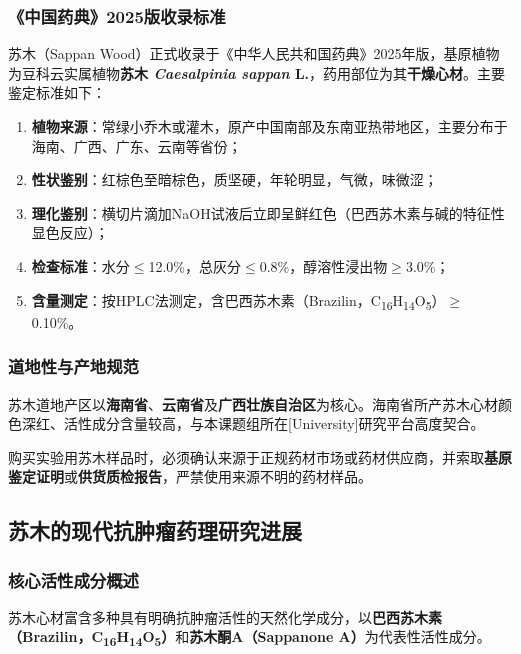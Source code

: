 \documentclass[12pt,a4paper]{article}
\begin{document}
\subsubsection{《中国药典》2025版收录标准}

苏木（Sappan Wood）正式收录于《中华人民共和国药典》2025年版，基原植物为豆科云实属植物\textbf{苏木 \textit{Caesalpinia sappan} L.}，药用部位为其\textbf{干燥心材}\cite{ref1}。主要鉴定标准如下：

\begin{enumerate}
\item \textbf{植物来源}：常绿小乔木或灌木，原产中国南部及东南亚热带地区，主要分布于海南、广西、广东、云南等省份；
\item \textbf{性状鉴别}：红棕色至暗棕色，质坚硬，年轮明显，气微，味微涩；
\item \textbf{理化鉴别}：横切片滴加NaOH试液后立即呈鲜红色（巴西苏木素与碱的特征性显色反应）；
\item \textbf{检查标准}：水分$\leq$12.0\%，总灰分$\leq$0.8\%，醇溶性浸出物$\geq$3.0\%；
\item \textbf{含量测定}：按HPLC法测定，含巴西苏木素（Brazilin，C\textsubscript{16}H\textsubscript{14}O\textsubscript{5}）$\geq$0.10\%。
\end{enumerate}

\subsubsection{道地性与产地规范}

苏木道地产区以\textbf{海南省}、\textbf{云南省}及\textbf{广西壮族自治区}为核心。海南省所产苏木心材颜色深红、活性成分含量较高，与本课题组所在[University]研究平台高度契合\cite{ref1}。

\begin{notebox}
购买实验用苏木样品时，必须确认来源于正规药材市场或药材供应商，并索取\textbf{基原鉴定证明}或\textbf{供货质检报告}，严禁使用来源不明的药材样品。
\end{notebox}

\subsection{苏木的现代抗肿瘤药理研究进展}

\subsubsection{核心活性成分概述}

苏木心材富含多种具有明确抗肿瘤活性的天然化学成分，以\textbf{巴西苏木素（Brazilin，C\textsubscript{16}H\textsubscript{14}O\textsubscript{5}）}和\textbf{苏木酮A（Sappanone A）}为代表性活性成分\cite{ref3,ref4}。
\end{document}
